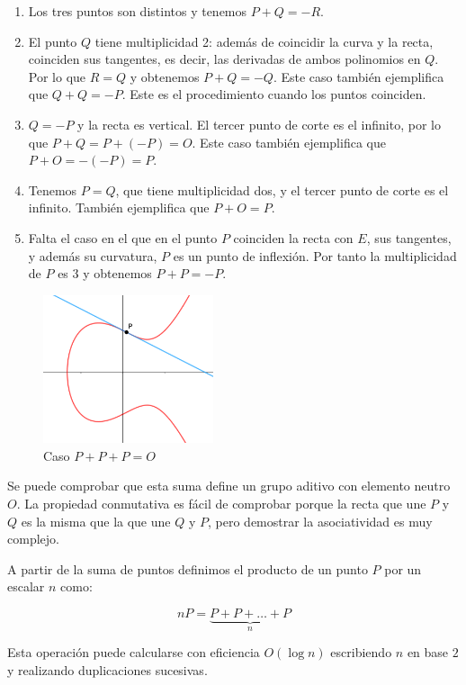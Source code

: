 \documentclass{article}
\begin{document}
\begin{enumerate}
\item Los tres puntos son distintos y tenemos $P+Q=-R$.

\item El punto $Q$ tiene multiplicidad 2: además de coincidir la curva
y la recta, coinciden sus tangentes, es decir, las derivadas de ambos
polinomios en $Q$. Por lo que $R=Q$ y obtenemos $P+Q=-Q$. Este caso
también ejemplifica que $Q+Q=-P$. Este es el procedimiento cuando los
puntos coinciden.

\item $Q=-P$ y la recta es vertical. El tercer punto de corte es el
infinito, por lo que $P+Q=P+(-P)=O$. Este caso también ejemplifica que
$P+O=-(-P)=P$.

\item Tenemos $P=Q$, que tiene multiplicidad dos, y el tercer punto de
corte es el infinito. También ejemplifica que $P+O=P$.

\item Falta el caso en el que en el punto $P$ coinciden la recta con
$E$, sus tangentes, y además su curvatura, $P$ es un punto de
inflexión. Por tanto la multiplicidad de $P$ es $3$ y obtenemos
$P+P=-P$.
\end{enumerate}

\begin{figure}[H]
  \centering
  \includegraphics[width=50mm]{imagenes/suma3P}
  \caption{Caso $P+P+P = O$}
\end{figure}

Se puede comprobar que esta suma define un grupo aditivo con elemento
neutro $O$. La propiedad conmutativa es fácil de comprobar porque la
recta que une $P$ y $Q$ es la misma que la que une $Q$ y $P$, pero
demostrar la asociatividad es muy complejo.

A partir de la suma de puntos definimos el producto de un punto $P$
por un escalar $n$ como:

$$nP = \underbrace{P + P + \ldots + P}_{{n}}$$

Esta operación puede calcularse con eficiencia $O(\log n)$ escribiendo
$n$ en base $2$ y realizando duplicaciones sucesivas.
\end{document}

